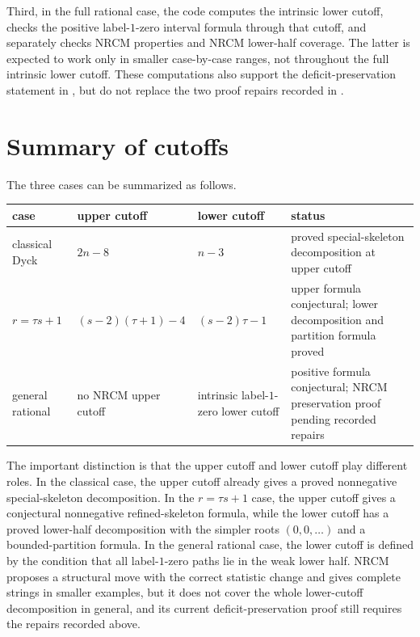 \documentclass[11pt]{article}
\begin{document}
Third, in the full rational case, the code computes the intrinsic lower cutoff,
checks the positive label-\(1\)-zero interval formula through that cutoff, and
separately checks NRCM properties and NRCM lower-half coverage.  The latter is
expected to work only in smaller case-by-case ranges, not throughout the full
intrinsic lower cutoff.  These computations also support the
deficit-preservation statement in , but do
not replace the two proof repairs recorded in .

\section{Summary of cutoffs}

The three cases can be summarized as follows.

\begin{center}
\small
\renewcommand{\arraystretch}{1.25}
\begin{tabular}{p{}|p{}|p{}|p{}}
\textbf{case} & \textbf{upper cutoff} & \textbf{lower cutoff} & \textbf{status} \\
\hline
classical Dyck
&
\(2n-8\)
&
\(n-3\)
&
proved special-skeleton decomposition at upper cutoff
\\
\(r=\tau s+1\)
&
\((s-2)(\tau+1)-4\)
&
\((s-2)\tau-1\)
&
upper formula conjectural; lower decomposition and partition formula proved
\\
general rational
&
no NRCM upper cutoff
&
intrinsic label-\(1\)-zero lower cutoff
&
positive formula conjectural; NRCM preservation proof pending recorded repairs
\end{tabular}
\end{center}

The important distinction is that the upper cutoff and lower cutoff play
different roles.  In the classical case, the upper cutoff already gives a
proved nonnegative special-skeleton decomposition.  In the \(r=\tau s+1\)
case, the upper cutoff gives a conjectural nonnegative refined-skeleton
formula, while the lower cutoff has a proved lower-half decomposition with the
simpler roots \((0,0,\ldots)\) and a bounded-partition formula.  In the general
rational case, the lower cutoff is defined by the condition that all
label-\(1\)-zero paths lie in the weak lower half.  NRCM proposes a structural
move with the correct statistic change and gives complete strings in smaller
examples, but it does not cover the whole lower-cutoff decomposition in
general, and its current deficit-preservation proof still requires the repairs
recorded above.
\end{document}
